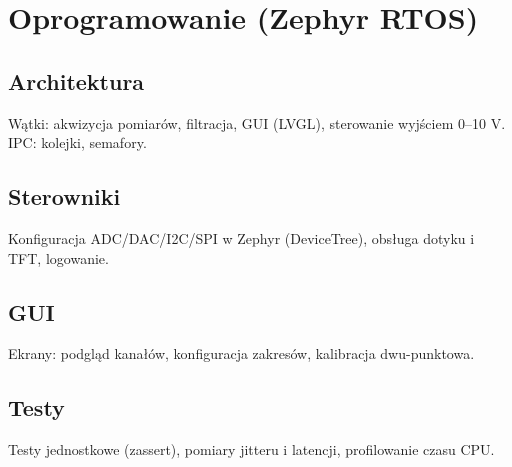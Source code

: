 \section{Oprogramowanie (Zephyr RTOS)}
\subsection{Architektura}
Wątki: akwizycja pomiarów, filtracja, GUI (LVGL), sterowanie wyjściem 0–10 V. IPC: kolejki, semafory.

\subsection{Sterowniki}
Konfiguracja ADC/DAC/I2C/SPI w Zephyr (DeviceTree), obsługa dotyku i TFT, logowanie.

\subsection{GUI}
Ekrany: podgląd kanałów, konfiguracja zakresów, kalibracja dwu-punktowa.

\subsection{Testy}
Testy jednostkowe (zassert), pomiary jitteru i latencji, profilowanie czasu CPU.